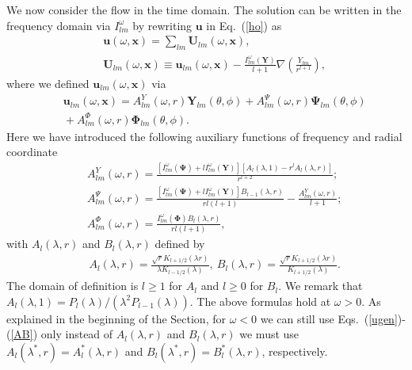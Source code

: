 \documentclass[aps,prx,twocolumn,amsmath,amssymb,amsfonts]{revtex4-2}
\begin{document}
We now consider the flow in the time domain. The solution can be written in the frequency domain via $I_{lm}^{\omega}$ by rewriting $\bm u$ in Eq.~(\ref{ho}) as
\begin{eqnarray}&&
\bm u(\omega, \bm x) \!= \!\sum_{lm}\bm U_{lm}(\omega, \bm x),\label{ugn}\\&&
\bm U_{lm}(\omega, \bm x)\equiv \bm u_{lm}(\omega, \bm x)-\frac{I^{\omega}_{lm}(\bm Y)}{l+1}\nabla \left(\frac{Y_{lm}}{r^{l+1}}\right), \nonumber
\end{eqnarray}
where we defined $\bm u_{lm}(\omega, \bm x)$ via
\begin{eqnarray}&&\!\!\!\!\!\!
\bm u_{lm}(\omega, \bm x)\!=\! A_{lm}^{Y}(\omega, r)\bm Y_{lm}(\theta, \phi)\!+\!A_{lm}^{\Psi}(\omega, r)\bm \Psi_{lm}(\theta, \phi)
\nonumber\\&&\!\!\!\!\!\!
+A_{lm}^{\Phi}(\omega, r)\bm \Phi_{lm}(\theta, \phi).\label{ugen}
\end{eqnarray}
Here we have introduced the following auxiliary functions of frequency and radial coordinate
\begin{eqnarray}&&
A_{lm}^{Y}(\omega, r)\! = \!\frac{\left[ I_{lm}^{\omega}(\bm \Psi) \!+\! l I_{lm}^{\omega}(\bm Y)\right]\left[A_{l}(\lambda, 1)\!-\!r^l A_{l}(\lambda, r)\right]}{r^{l+2}};
\nonumber\\&&
A_{lm}^{\Psi}(\omega, r)\!=\!
\frac{\left[ I_{lm}^{\omega}(\bm \Psi)\! +\! l I_{lm}^{\omega}(\bm Y)\right] B_{l-1}(\lambda, r)}{rl(l+1)} %
-\frac{A_{lm}^{Y}(\omega, r)}{l+1};
\nonumber\\&&
A_{lm}^{\Phi}(\omega, r)\! =\!  \frac{I_{lm}^{\omega}(\bm \Phi) B_l(\lambda, r)}{rl(l+1)},
\label{APhis}
\end{eqnarray}
with $A_{l}(\lambda, r)$ and $B_{l}(\lambda, r)$ defined by
\begin{eqnarray}&&\!\!\!\!\!\!\!
A_l(\lambda, r)\!=\!\frac{\sqrt{r}K_{l+1/2}(\lambda r)}{\lambda K_{l-1/2}(\lambda)},\
B_l(\lambda, r)\!=\!\frac{\sqrt{r}K_{l+1/2}(\lambda r)}{K_{l+1/2}(\lambda)}. \label{AB}
\end{eqnarray}
The domain of definition is $l\geq 1$ for $A_l$ and $l\geq 0$ for $B_l$. We remark that $A_{l}(\lambda, 1)=P_l(\lambda)/(\lambda^2 P_{l-1}(\lambda))$. The above formulas hold at $\omega>0$. As explained in the beginning of the Section, for $\omega<0$ we can still use Eqs.~(\ref{ugen})-(\ref{AB}) only instead of $A_l(\lambda, r)$ and  $B_l(\lambda, r)$ we must use $A_l(\lambda^*, r)=A_l^*(\lambda, r)$ and $B_l(\lambda^*, r)=B_l^*(\lambda, r)$, respectively.
\end{document}
